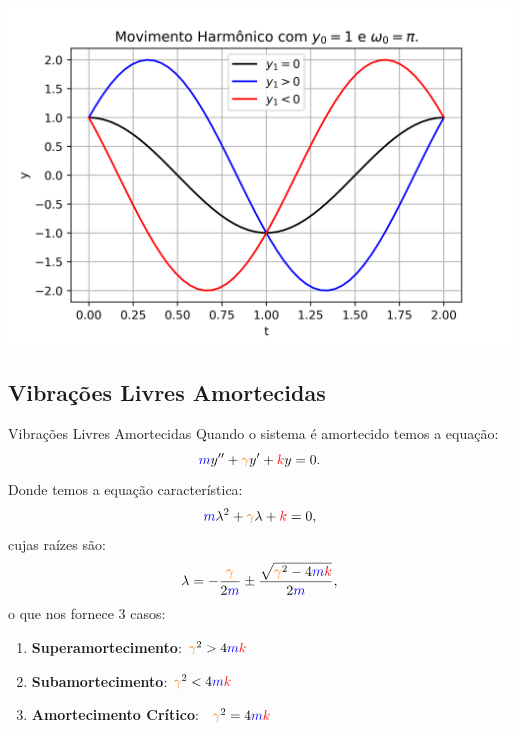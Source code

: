 \begin{frame}
\begin{center}
\includegraphics[scale=0.8]{osc-harm.png}
\end{center}
\end{frame}


\subsection{Vibrações Livres Amortecidas}


\begin{frame}{Vibrações Livres Amortecidas}
Quando o sistema é amortecido temos a equação:
\[{\color{blue}m}y''+{\color{orange}\gamma} y'+{\color{red}k}y =0.\]
Donde temos a equação característica:
\[{\color{blue}m}\lambda^2+{\color{orange}\gamma} \lambda+{\color{red}k} =0,\]
cujas raízes são:
\[\lambda=-\frac{{\color{orange}\gamma}}{2{\color{blue}m}}\pm \frac{\sqrt{{\color{orange}\gamma}^2-4{\color{blue}m} {\color{red}k}}}{2{\color{blue}m}},\]
o que nos fornece 3 casos:

\begin{enumerate}
\item \textbf{Superamortecimento}: \quad ${\color{orange}\gamma}^2>4{\color{blue}m} {\color{red}k}$
\item \textbf{Subamortecimento}: \qquad  ${\color{orange}\gamma}^2<4{\color{blue}m} {\color{red}k}$
\item \textbf{Amortecimento Crítico}: \ ${\color{orange}\gamma}^2=4{\color{blue}m} {\color{red}k}$
\end{enumerate}
\end{frame}


